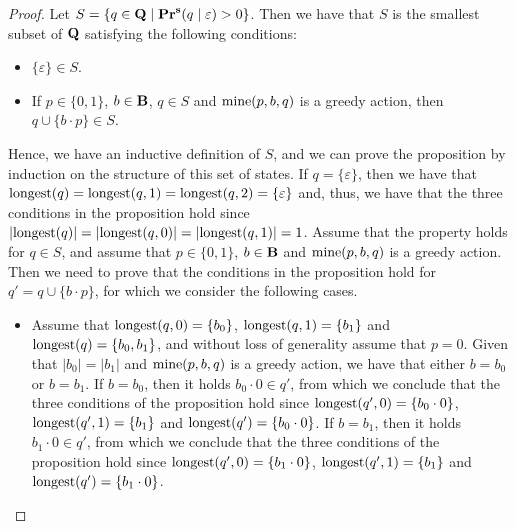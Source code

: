 \begin{proof}
Let $S = \{ q \in \mathbf{Q} \mid \mathbf{Pr}^{\mathbf{s}}(q \mid \varepsilon) > 0 \}$. Then we have that $S$ is the smallest subset of $\mathbf{Q}$ satisfying the following conditions:
\begin{itemize}
\item $\{\varepsilon\} \in S$.

\item If $p \in \{0,1\}$, $b \in \mathbf{B}$, $q \in S$ and $\text{\rm mine}(p,b,q)$ is a greedy action, then $q \cup \{ b \cdot p\} \in S$.
\end{itemize}
Hence, we have an inductive definition of $S$, and we can prove the proposition by induction on the structure of this set of states. If $q = \{ \varepsilon \}$, then we have that ${\text{\rm longest}}(q) = {\text{\rm longest}}(q,1) = {\text{\rm longest}}(q,2) = \{ \varepsilon \}$ and, thus, we have that  the three conditions in the proposition hold since $|{\text{\rm longest}}(q)| = |{\text{\rm longest}}(q,0)| = |{\text{\rm longest}}(q,1)| = 1$. Assume that the property holds for $q \in S$, and assume that $p \in \{0,1\}$, $b \in \mathbf{B}$ and $\text{\rm mine}(p,b,q)$ is a greedy action. Then we need to prove that the conditions in the proposition hold for $q ' = q \cup \{b \cdot p \}$, for which we consider the following cases.
\begin{itemize}
\item Assume that ${\text{\rm longest}}(q,0) = \{b_0\}$,  ${\text{\rm longest}}(q, 1) = \{b_1\}$ and ${\text{\rm longest}}(q) = \{b_0,b_1\}$, and without loss of generality assume that $p = 0$. Given that $|b_0| = |b_1|$ and $\text{\rm mine}(p,b,q)$ is a greedy action, we have that either $b = b_0$ or $b = b_1$. If $b = b_0$, then it holds $b_0 \cdot 0 \in q'$, from which we conclude that the three conditions of the proposition hold since ${\text{\rm longest}}(q',0) = \{b_0 \cdot 0\}$, ${\text{\rm longest}}(q',1) = \{b_1\}$ and ${\text{\rm longest}}(q') = \{b_0 \cdot 0\}$.  If $b = b_1$, then it holds $b_1 \cdot 0 \in q'$, from which we conclude that the three conditions of the proposition hold since ${\text{\rm longest}}(q',0) = \{b_1 \cdot 0\}$, ${\text{\rm longest}}(q',1) = \{b_1\}$ and ${\text{\rm longest}}(q') = \{b_1 \cdot 0\}$.


\end{itemize}
\end{proof}
